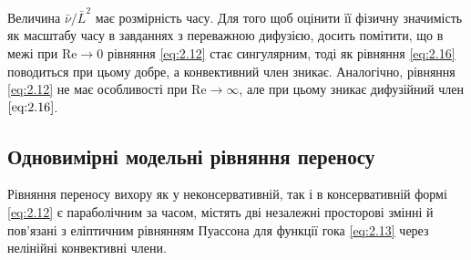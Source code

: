 Величина $\bar \nu / \bar L^2$ має розмірність часу. Для того щоб оцінити її фізичну значимість як масштабу часу в завданнях з переважною дифузією, досить помітити, що в межі при $\text{Re} \to 0$ рівняння \eqref{eq:2.12} стає сингулярним, тоді як рівняння \eqref{eq:2.16} поводиться при цьому добре, а конвективний член зникає. Аналогічно, рівняння \eqref{eq:2.12} не має особливості при $\text{Re} \to \infty$, але при цьому зникає дифузійний член $\eqref{eq:2.16}$. 

\subsection{Одновимірні модельні рівняння переносу}

Рівняння переносу вихору як у неконсервативній, так і в консервативній формі \eqref{eq:2.12} є параболічним за часом, містять дві незалежні просторові змінні й пов'язані з еліптичним рівнянням Пуассона для функції гока \eqref{eq:2.13} через нелінійні конвективні члени.

